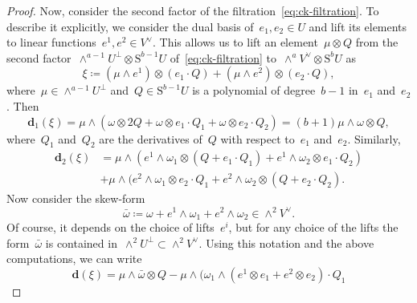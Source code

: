 \documentclass[a4paper]{article}
\newcommand{\Sy}{\mathrm{S}}
\newcommand{\vn}{\mathbf{d}}
\theoremstyle{remark}
\theoremstyle{definition}
\begin{document}
\begin{proof}
Now, consider the second factor of the filtration~\eqref{eq:ck-filtration}.
To describe it explicitly, we consider the dual basis of~\(e_1,e_2 \in U\)
and lift its elements to linear functions~\(e^1,e^2 \in V^\vee\).
This allows us to lift an element~\(\mu \otimes Q\) 
from the second factor~\(\wedge^{a-1}U^\perp \otimes \Sy^{b-1}U\) of~\eqref{eq:ck-filtration} 
to~\(\wedge^aV^\vee \otimes \Sy^bU\) as
\begin{equation*}
\xi \coloneqq (\mu \wedge e^1) \otimes (e_1 \cdot Q) + (\mu \wedge e^2) \otimes (e_2 \cdot Q),
\end{equation*}
where~\(\mu \in \wedge^{a-1}U^\perp\) and~\(Q \in \Sy^{b - 1}U\) is a polynomial of degree~\(b - 1\) in~\(e_1\) and~\(e_2\).
Then
\begin{equation*}
\vn_1(\xi) = 
\mu \wedge (\omega \otimes 2Q + \omega \otimes e_1 \cdot Q_1 + \omega \otimes e_2 \cdot Q_2) =
(b + 1)\mu \wedge \omega \otimes Q,
\end{equation*}
where~\(Q_1\) and~\(Q_2\) are the derivatives of~\(Q\) with respect to~\(e_1\) and~\(e_2\).
Similarly,
\begin{align*}
\vn_2(\xi) 
&= \mu \wedge (e^1 \wedge \omega_1 \otimes (Q + e_1 \cdot Q_1) + e^1 \wedge \omega_2 \otimes e_1 \cdot Q_2) \\ 
&+ \mu \wedge (e^2 \wedge \omega_1 \otimes e_2 \cdot Q_1 + e^2 \wedge \omega_2 \otimes (Q + e_2 \cdot Q_2).
\end{align*}
Now consider the skew-form
\begin{equation}
\label{eq:def-bar-omega}
\bar\omega \coloneqq \omega + e^1 \wedge \omega_1 + e^2 \wedge \omega_2 \in \wedge^2V^\vee.
\end{equation} 
Of course, it depends on the choice of lifts~\(e^i\), 
but for any choice of the lifts the form~\(\bar\omega\) is contained in~\mbox{\(\wedge^2U^\perp \subset \wedge^2V^\vee\)}.
Using this notation and the above computations, we can write
\begin{equation*}
\vn(\xi) = \mu \wedge \bar\omega \otimes Q 
- \mu \wedge \Big(\omega_1 \wedge (e^1 \otimes e_1 + e^2 \otimes e_2) \cdot Q_1 

\end{equation*}
\end{proof}
\end{document}

